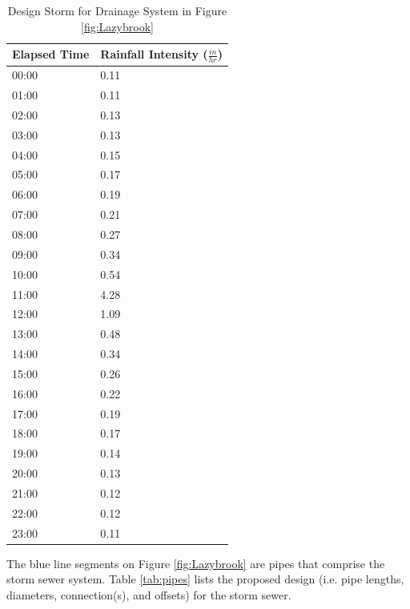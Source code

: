 \documentclass[12pt]{article}
\begin{document}
\begin{enumerate}
\begin{table}[ht!]
   \centering
      \caption{Design Storm for Drainage System in Figure \ref{fig:Lazybrook} \\}
   \begin{tabular}{| p{1.6in} | p{1.7in} |} %
   \hline
   \hline
Elapsed Time & Rainfall Intensity ($\frac{in}{hr}$) \\
\hline
\hline
00:00 & 0.11 \\
01:00 & 0.11 \\
02:00 & 0.13 \\
03:00 & 0.13 \\
04:00 & 0.15 \\
05:00 & 0.17 \\
06:00 & 0.19 \\
07:00 & 0.21 \\
08:00 & 0.27 \\
09:00 & 0.34 \\
10:00 & 0.54 \\
11:00 & 4.28 \\
12:00 & 1.09 \\
13:00 & 0.48 \\
14:00 & 0.34 \\
15:00 & 0.26 \\
16:00 & 0.22 \\
17:00 & 0.19 \\
18:00 & 0.17 \\
19:00 & 0.14 \\
20:00 & 0.13 \\
21:00 & 0.12 \\
22:00 & 0.12 \\
23:00 & 0.11 \\
\hline
\hline
   \end{tabular}
   \label{tab:storm}
\end{table}

The blue line segments on Figure \ref{fig:Lazybrook} are pipes that comprise the storm sewer system.   Table \ref{tab:pipes} lists the proposed design (i.e. pipe lengths, diameters, connection(s), and offsets) for the storm sewer.

\clearpage


\end{enumerate}
\end{document}
